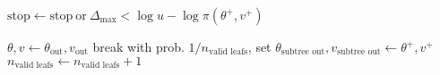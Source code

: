 \documentclass{article}
\begin{document}
\begin{algorithm}
\begin{algorithmic}
		\State $\textrm{stop} \gets \textrm{stop} \ \textrm{or} \ \Delta_\mathrm{max} < \log u - \log \pi(\theta^+, v^+)$ 
			
			\State $\theta, v \gets \theta_\textrm{out}, v_\textrm{out}$ 
			\State break
		\Else
			 
				\State with prob. $1/n_\textrm{valid leafs}$, set $\theta_\textrm{subtree out}, v_\textrm{subtree out} \gets \theta^+, v^+$ 
				\State $n_\textrm{valid leafs} \gets n_\textrm{valid leafs} + 1$
			\EndIf
		\EndIf
		
	\EndFor
\EndFor
\end{algorithmic}
\end{algorithm}
\end{document}
